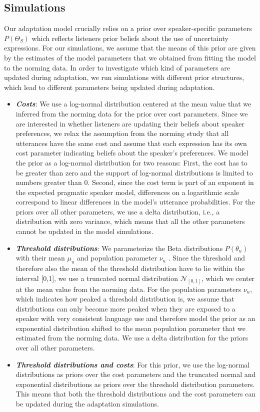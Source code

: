 \documentclass[lucida,biblatex]{sp} %
\begin{document}
\subsection{Simulations}

Our adaptation model crucially relies on a prior over speaker-specific parameters $P(\Theta_S)$
which reflects listeners prior beliefs about the use of uncertainty expressions. For our simulations,
we assume that the means of this prior are given by the estimates of the model parameters that 
we obtained from fitting the model to the norming data.
In order to investigate which kind of parameters are updated during adaptation, we run simulations
with different prior structures, which lead to different parameters being updated during adaptation.

\begin{itemize}
\item \textbf{\textit{Costs}}: We use a log-normal distribution centered at the mean value that we inferred from the norming data for the prior over cost parameters. Since we are interested in whether listeners are updating their beliefs about speaker preferences, we relax the assumption from the norming study that all utterances have the same cost and assume that each expression has its own cost parameter indicating beliefs about the speaker's preferences. We model the prior as a log-normal distribution for two reasons: First, the cost has to be greater than zero and the support of log-normal distributions is limited to numbers greater than 0. Second, since the cost term is part of an exponent in the expected pragmatic speaker model, differences on a logarithmic scale correspond to linear differences in the model's utterance probabilities. For the priors over all other parameters, we use a delta distribution, i.e., a distribution with zero variance, which means that all the other parameters cannot be updated in the model simulations.
\item \textbf{\textit{Threshold distributions}}:  We parameterize the Beta distributions $P(\theta_u)$ with their mean $\mu_u$ and population parameter $\nu_u$ \citep{Kruschke2014}. Since the threshold and therefore also the mean of the threshold distribution have to lie within the interval [0,1], we use a truncated normal distribution $\mathscr{N}_{[0,1]}$, which we center at the mean value from the norming data. For the population parameters $\nu_u$, which indicates how peaked a threshold distribution is, we assume that distributions can only become more peaked when they are exposed to a speaker with very consistent language use and therefore model the prior as an exponential distribution shifted to the mean population parameter that we estimated from the norming data. We use a delta distribution for the priors over all other parameters.
\item  \textbf{\textit{Threshold distributions and costs}}: For this prior, we use the log-normal distributions as priors over the cost parameters and the truncated normal and exponential distributions as priors over the threshold distribution parameters. This means that both the threshold distributions and the cost parameters can be updated during the adaptation simulations.
\end{itemize}
\end{document}
